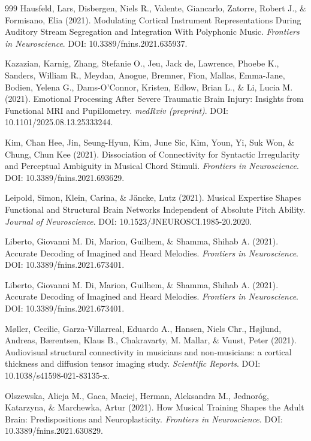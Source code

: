 \documentclass[9pt,onecolumn]{article}
\begin{document}
\begin{thebibliography}{999}
Hausfeld, Lars, Disbergen, Niels R., Valente, Giancarlo, Zatorre, Robert J., \& Formisano, Elia (2021). Modulating Cortical Instrument Representations During Auditory Stream Segregation and Integration With Polyphonic Music. \textit{Frontiers in Neuroscience}. DOI: 10.3389/fnins.2021.635937.

Kazazian, Karnig, Zhang, Stefanie O., Jeu, Jack de, Lawrence, Phoebe K., Sanders, William R., Meydan, Anogue, Bremner, Fion, Mallas, Emma-Jane, Bodien, Yelena G., Dams-O'Connor, Kristen, Edlow, Brian L., \& Li, Lucia M. (2021). Emotional Processing After Severe Traumatic Brain Injury: Insights from Functional MRI and Pupillometry. \textit{medRxiv (preprint)}. DOI: 10.1101/2025.08.13.25333244.

Kim, Chan Hee, Jin, Seung-Hyun, Kim, June Sic, Kim, Youn, Yi, Suk Won, \& Chung, Chun Kee (2021). Dissociation of Connectivity for Syntactic Irregularity and Perceptual Ambiguity in Musical Chord Stimuli. \textit{Frontiers in Neuroscience}. DOI: 10.3389/fnins.2021.693629.

Leipold, Simon, Klein, Carina, \& Jäncke, Lutz (2021). Musical Expertise Shapes Functional and Structural Brain Networks Independent of Absolute Pitch Ability. \textit{Journal of Neuroscience}. DOI: 10.1523/JNEUROSCI.1985-20.2020.

Liberto, Giovanni M. Di, Marion, Guilhem, \& Shamma, Shihab A. (2021). Accurate Decoding of Imagined and Heard Melodies. \textit{Frontiers in Neuroscience}. DOI: 10.3389/fnins.2021.673401.

Liberto, Giovanni M. Di, Marion, Guilhem, \& Shamma, Shihab A. (2021). Accurate Decoding of Imagined and Heard Melodies. \textit{Frontiers in Neuroscience}. DOI: 10.3389/fnins.2021.673401.

Møller, Cecilie, Garza-Villarreal, Eduardo A., Hansen, Niels Chr., Højlund, Andreas, Bærentsen, Klaus B., Chakravarty, M. Mallar, \& Vuust, Peter (2021). Audiovisual structural connectivity in musicians and non-musicians: a cortical thickness and diffusion tensor imaging study. \textit{Scientific Reports}. DOI: 10.1038/s41598-021-83135-x.

Olszewska, Alicja M., Gaca, Maciej, Herman, Aleksandra M., Jednoróg, Katarzyna, \& Marchewka, Artur (2021). How Musical Training Shapes the Adult Brain: Predispositions and Neuroplasticity. \textit{Frontiers in Neuroscience}. DOI: 10.3389/fnins.2021.630829.


\end{thebibliography}
\end{document}
